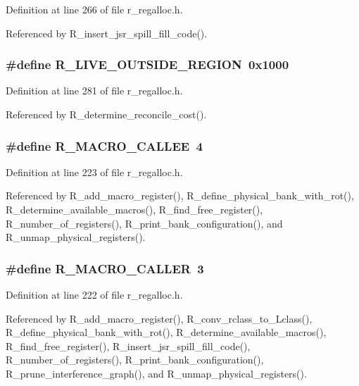 Definition at line 266 of file r\_\-regalloc.h.

Referenced by R\_\-insert\_\-jsr\_\-spill\_\-fill\_\-code().
\subsubsection{\setlength{\rightskip}{0pt plus 5cm}\#define R\_\-LIVE\_\-OUTSIDE\_\-REGION~0x1000}\label{r__regalloc_8h_4a38eb6e49c1dc696cce5839f08cbb0e}




Definition at line 281 of file r\_\-regalloc.h.

Referenced by R\_\-determine\_\-reconcile\_\-cost().
\subsubsection{\setlength{\rightskip}{0pt plus 5cm}\#define R\_\-MACRO\_\-CALLEE~4}\label{r__regalloc_8h_06ff3fe294594741632fdd172e236c33}




Definition at line 223 of file r\_\-regalloc.h.

Referenced by R\_\-add\_\-macro\_\-register(), R\_\-define\_\-physical\_\-bank\_\-with\_\-rot(), R\_\-determine\_\-available\_\-macros(), R\_\-find\_\-free\_\-register(), R\_\-number\_\-of\_\-registers(), R\_\-print\_\-bank\_\-configuration(), and R\_\-unmap\_\-physical\_\-registers().
\subsubsection{\setlength{\rightskip}{0pt plus 5cm}\#define R\_\-MACRO\_\-CALLER~3}\label{r__regalloc_8h_4816155f3da0373280325b8def30844a}




Definition at line 222 of file r\_\-regalloc.h.

Referenced by R\_\-add\_\-macro\_\-register(), R\_\-conv\_\-rclass\_\-to\_\-Lclass(), R\_\-define\_\-physical\_\-bank\_\-with\_\-rot(), R\_\-determine\_\-available\_\-macros(), R\_\-find\_\-free\_\-register(), R\_\-insert\_\-jsr\_\-spill\_\-fill\_\-code(), R\_\-number\_\-of\_\-registers(), R\_\-print\_\-bank\_\-configuration(), R\_\-prune\_\-interference\_\-graph(), and R\_\-unmap\_\-physical\_\-registers().
